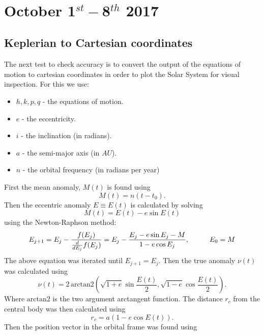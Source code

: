 \documentclass[11pt, oneside]{article}   	%
\begin{document}
\newpage
\
\newpage

\section{October 1$^{st} - $8$^{th}$ 2017}

\subsection{Keplerian to Cartesian coordinates}

The next test to check accuracy is to convert the output of the equations of motion to cartesian coordinates in order to plot the Solar System for visual inspection. For this we use:
\begin{itemize}
\item $h, k, p, q$ - the equations of motion.
\item $e$ - the eccentricity.
\item $i$ - the inclination (in radians).
\item $a$ - the semi-major axis (in $AU$).
\item $n$ - the orbital frequency (in radians per year)
\end{itemize}
First the mean anomaly, $M(t)$ is found using
\begin{equation}
M(t) = n(t-t_{0}).
\end{equation}
Then the eccentric anomaly $E \equiv E(t)$ is calculated by solving
\begin{equation}
M(t) = E(t) - e\sin E(t)
\end{equation}
using the Newton-Raphson method:
\begin{equation}
E_{j+1} = E_{j} - \frac{f(E_{j})}{\frac{d}{dE_{j}}f(E_{j})} = E_{j} - \frac{E_{j} - e\sin E_{j} - M}{1-e\cos E_{j}}, \hspace*{1cm} E_{0}=M
\end{equation}
The above equation was iterated until $E_{j+1} = E_{j}$. Then the true anomaly $\nu(t)$ was calculated using
\begin{equation}
\nu(t) = 2 \, \text{arctan2} \left (\sqrt{1+e} \sin \frac{E(t)}{2}, \sqrt{1-e} \cos \frac{E(t)}{2} \right).
\end{equation}
Where $ \text{arctan2}$ is the two argument arctangent function. The distance $r_{c}$ from the central body was then calculated using
\begin{equation}
r_{c} = a(1-e \cos E(t)).
\end{equation}
Then the position vector in the orbital frame was found using
\end{document}
